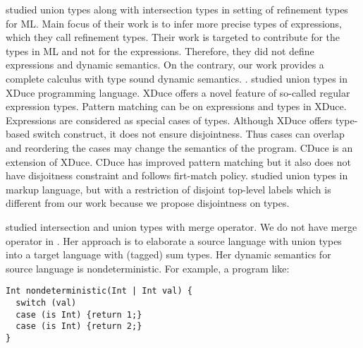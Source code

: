\citet{freeman1991refinement} studied union types along with intersection types
in setting of refinement types for ML. Main focus of their work is to infer
more precise types of expressions, which they call
refinement types. Their work is targeted to contribute for the types
in ML and not for the expressions. Therefore, they did not define
expressions and dynamic semantics. On the contrary, our work provides
a complete calculus with type sound dynamic semantics.
.
\citet{hosoya2003xduce} studied union types
in XDuce programming language. XDuce offers a novel feature of
so-called regular expression types. Pattern matching can be on
expressions and types in XDuce.  Expressions are considered as special
cases of types. Although XDuce offers type-based switch construct,
it does not ensure disjointness. Thus cases can overlap and
reordering the cases may change the semantics of the program. CDuce
\cite{benzaken2003cduce} is an extension of XDuce. CDuce has improved
pattern matching but it also does not have disjoitness constraint and
follows firt-match policy.  \citet{fallside2001xml} studied union
types in markup language, but with a restriction of disjoint top-level
labels which is different from our work because we propose
disjointness on types.

\citet{dunfield2014elaborating} studied intersection and union
types with merge operator.
We do not have merge operator in \cal.
Her approach is to elaborate a source language with union types into a
target language with (tagged) sum types.
Her dynamic semantics for source language is nondeterministic.
For example, a program like:

\begin{lstlisting}
Int nondeterministic(Int | Int val) {
  switch (val)
  case (is Int) {return 1;}
  case (is Int) {return 2;} 
}
\end{lstlisting}

